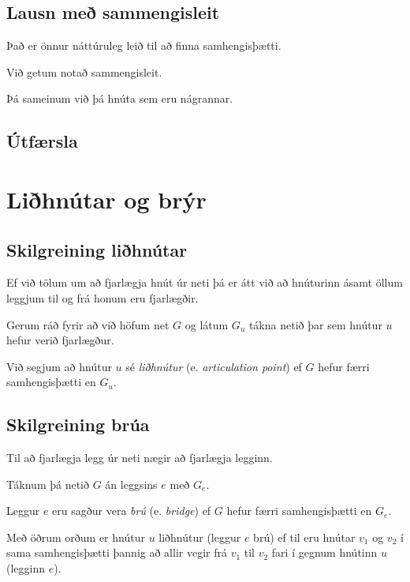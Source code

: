 \subsection{Lausn með sammengisleit}
{
	{
		\item<1-> Það er önnur náttúruleg leið til að finna samhengisþætti.
		\item<2-> Við getum notað sammengisleit.
		\item<3-> Þá sameinum við þá hnúta sem eru nágrannar.
	}
}

\subsection{Útfærsla}
{
}

\section{Liðhnútar og brýr}
\subsection{Skilgreining liðhnútar}
{
	{
		\item<1-> Ef við tölum um að fjarlægja hnút úr neti þá er átt við að hnúturinn ásamt öllum leggjum til og frá honum eru fjarlægðir.
		\item<2-> Gerum ráð fyrir að við höfum net $G$ og látum $G_u$ tákna netið þar sem hnútur $u$ hefur verið fjarlægður.
		\item<3-> Við segjum að hnútur $u$ sé \emph{liðhnútur} (e. \emph{articulation point}) ef $G$ hefur færri samhengisþætti en $G_u$.
	}
}

\subsection{Skilgreining brúa}
{
	{
		\item<1-> Til að fjarlægja legg úr neti nægir að fjarlægja legginn.
		\item<2-> Táknum þá netið $G$ án leggsins $e$ með $G_e$.
		\item<3-> Leggur $e$ eru sagður vera \emph{brú} (e. \emph{bridge}) ef $G$ hefur færri samhengisþætti en $G_e$.
		\item<4-> Með öðrum orðum er hnútur $u$ liðhnútur (leggur $e$ brú) ef til eru hnútar $v_1$ og $v_2$ í sama samhengisþætti
					þannig að allir vegir frá $v_1$ til $v_2$ fari í gegnum hnútinn $u$ (legginn $e$).
	}
}

